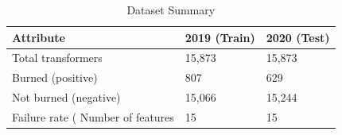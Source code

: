 \begin{table}
\caption{Dataset Summary}
\label{tab:dataset}
\begin{tabular}{lll}
\toprule
Attribute & 2019 (Train) & 2020 (Test) \\
\midrule
Total transformers & 15,873 & 15,873 \\
Burned (positive) & 807 & 629 \\
Not burned (negative) & 15,066 & 15,244 \\
Failure rate (%
Number of features & 15 & 15 \\
\bottomrule
\end{tabular}
\end{table}
